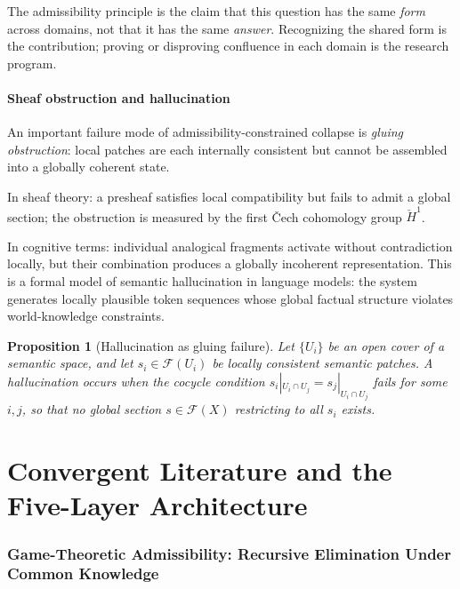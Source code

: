 \documentclass[12pt, a4paper]{article}
\theoremstyle{plain}
\newtheorem{proposition}[theorem]{Proposition}
\theoremstyle{definition}
\theoremstyle{remark}
\begin{document}
The admissibility principle is the claim that this question has the
same \emph{form} across domains, not that it has the same
\emph{answer}.
Recognizing the shared form is the contribution; proving or disproving
confluence in each domain is the research program.

\subsection{Sheaf obstruction and hallucination}

An important failure mode of admissibility-constrained collapse is
\emph{gluing obstruction}: local patches are each internally consistent
but cannot be assembled into a globally coherent state.

In sheaf theory: a presheaf satisfies local compatibility but fails
to admit a global section; the obstruction is measured by the first
\v{C}ech cohomology group $\check{H}^1$.

In cognitive terms: individual analogical fragments activate without
contradiction locally, but their combination produces a globally
incoherent representation.
This is a formal model of semantic hallucination in language models:
the system generates locally plausible token sequences whose global
factual structure violates world-knowledge constraints.

\begin{proposition}[Hallucination as gluing failure]
  Let $\{U_i\}$ be an open cover of a semantic space, and let
  $s_i \in \mathcal{F}(U_i)$ be locally consistent semantic patches.
  A \emph{hallucination} occurs when the cocycle condition
  $s_i|_{U_i \cap U_j} = s_j|_{U_i \cap U_j}$ fails for some $i, j$,
  so that no global section $s \in \mathcal{F}(X)$ restricting to
  all $s_i$ exists.
\end{proposition}

\part{Convergent Literature and the Five-Layer Architecture}

\section{Game-Theoretic Admissibility: Recursive Elimination Under
  Common Knowledge}
\label{sec:game}
\end{document}
